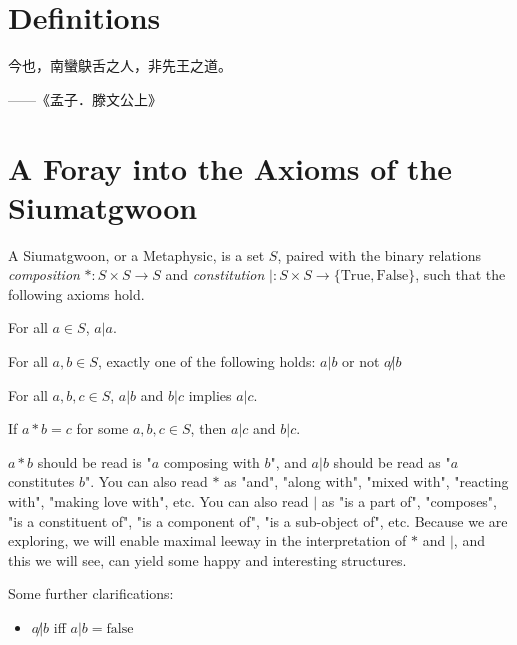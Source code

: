 \section{Definitions}

\epigraph{今也，南蠻鴃舌之人，非先王之道。}{——《孟子．滕文公上》}


\section{A Foray into the Axioms of the Siumatgwoon}

A Siumatgwoon, or a Metaphysic, is a set $S$, paired with the binary relations \textit{composition} $* : S \times S \rightarrow S$ and \textit{constitution} $|:S\times S \rightarrow \{\text{True}, \text{False}\}$, such that the following axioms hold. 

\begin{axiom}[Reflexivity]\label{ax:reflex}
For all $a \in S$, $a|a$.
\end{axiom}

\begin{axiom}[Totality]\label{ax:total}
For all $a,b\in S$, exactly one of the following holds: $a|b$ or not $a\not|b$
\end{axiom}

\begin{axiom}[Transitivity]\label{ax:trans}
For all $a,b,c\in S$, $a|b$ and $b|c$ implies $a|c$.
\end{axiom}

\begin{axiom}\label{ax:comp-const}
If $a*b=c$ for some $a,b,c\in S$, then $a|c$ and $b|c$.
\end{axiom}

$a * b$ should be read is "$a$ composing with $b$", and $a | b$ should be read as "$a$ constitutes $b$". You can also read $*$ as "and", "along with", "mixed with", "reacting with", "making love with", etc. You can also read $|$ as "is a part of", "composes", "is a constituent of", "is a component of", "is a sub-object of", etc. Because we are exploring, we will enable maximal leeway in the interpretation of $*$ and $|$, and this we will see, can yield some happy and interesting structures. 

Some further clarifications: 

\begin{itemize}
\item $a\not|b$ iff $a|b = \text{false}$
\end{itemize}

